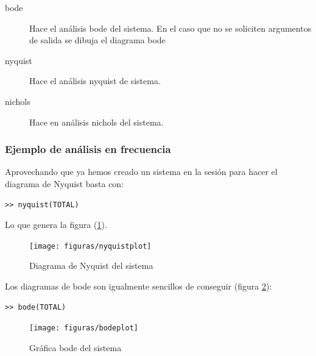 \begin{description}
\item [bode]Hace el análisis bode del sistema. En el caso
que no se soliciten argumentos de salida se dibuja el diagrama bode 
\item [nyquist]Hace el análisis nyquist de sistema. 
\item [nichols]Hace en análisis nichols del sistema. 
\end{description}

\subsubsection{Ejemplo de análisis en frecuencia}

\label{sec:ejercicioanalisis} Aprovechando que ya hemos creado un
sistema en la sesión para hacer el diagrama de Nyquist basta con:
\begin{verbatim}
>> nyquist(TOTAL)
\end{verbatim} Lo que genera la figura (\ref{fig:nyquist}). %
\begin{figure}
 \centering
    \texttt{[image: figuras/nyquistplot]}


\caption{\label{fig:nyquist}Diagrama de Nyquist del sistema}
\end{figure}


Los diagramas de bode son igualmente sencillos de conseguir (figura
\ref{cap:bode}): 
\begin{verbatim}
>> bode(TOTAL)
\end{verbatim}%
\begin{figure}
 \centering
    \texttt{[image: figuras/bodeplot]}

\caption{\label{cap:bode}Gráfica bode del sistema}
\end{figure}



